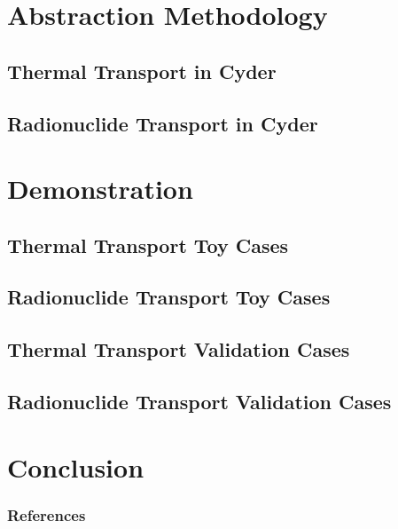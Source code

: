 \documentclass[9pt]{beamer}
\begin{document}
\section{Abstraction Methodology}

\subsection{Thermal Transport in Cyder}

\subsection{Radionuclide Transport in Cyder}


\section{Demonstration}

\subsection{Thermal Transport Toy Cases}

\subsection{Radionuclide Transport Toy Cases}

\subsection{Thermal Transport Validation Cases}

\subsection{Radionuclide Transport Validation Cases}


\section{Conclusion}

\begin{frame}[allowframebreaks]
  \frametitle{References}
  
  {\footnotesize  }

\end{frame}




\end{document}
